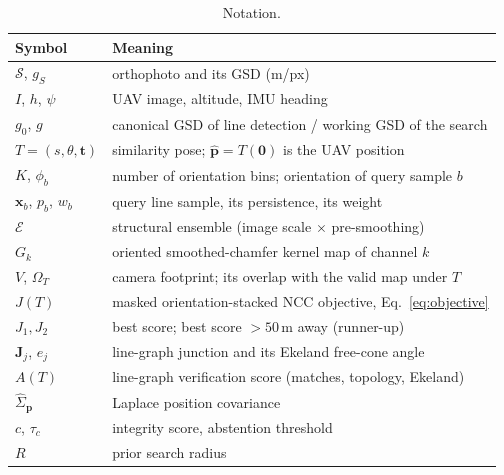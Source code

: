 \begin{table}[t]
\caption{Notation.}
\label{tab:notation}
\centering\small
\begin{tabular}{@{}ll@{}}
\toprule
Symbol & Meaning \\
\midrule
$\mathcal{S}$, $g_S$ & orthophoto and its GSD (m/px) \\
$I$, $h$, $\psi$ & UAV image, altitude, IMU heading \\
$g_0$, $g$ & canonical GSD of line detection / working GSD of the search \\
$T=(s,\theta,\mathbf t)$ & similarity pose; $\hat{\mathbf p}=T(\mathbf 0)$ is the UAV position \\
$K$, $\phi_b$ & number of orientation bins; orientation of query sample $b$ \\
$\mathbf x_b$, $p_b$, $w_b$ & query line sample, its persistence, its weight \\
$\mathcal E$ & structural ensemble (image scale $\times$ pre-smoothing) \\
$G_k$ & oriented smoothed-chamfer kernel map of channel $k$ \\
$V$, $\Omega_T$ & camera footprint; its overlap with the valid map under $T$ \\
$J(T)$ & masked orientation-stacked NCC objective, Eq.~\eqref{eq:objective} \\
$J_1, J_2$ & best score; best score $>50$\,m away (runner-up) \\
$\mathbf J_j$, $e_j$ & line-graph junction and its Ekeland free-cone angle \\
$A(T)$ & line-graph verification score (matches, topology, Ekeland) \\
$\hat\Sigma_{\mathbf p}$ & Laplace position covariance \\
$c$, $\tau_c$ & integrity score, abstention threshold \\
$R$ & prior search radius \\
\bottomrule
\end{tabular}
\end{table}
